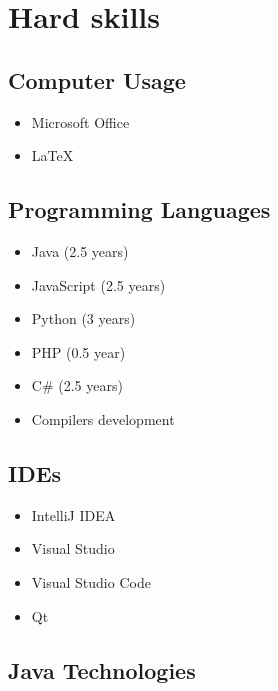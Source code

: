 \documentclass[a4paper,12pt]{article}
\begin{document}
\section*{Hard skills}

\subsection*{Computer Usage}

\begin{itemize}
    \item Microsoft Office
    \item LaTeX 
\end{itemize}

\subsection*{Programming Languages}

\begin{multicols}{2}
\begin{itemize}
    \item Java (2.5 years)
    \item JavaScript (2.5 years)
    \item Python (3 years)
    \item PHP (0.5 year)
    \item C\# (2.5 years)
    \item Compilers development
\end{itemize}
\end{multicols}

\subsection*{IDEs}

\begin{multicols}{2}
\begin{itemize}
    \item IntelliJ IDEA
    \item Visual Studio
    \item Visual Studio Code
    \item Qt
\end{itemize}
\end{multicols}

\subsection*{Java Technologies}
\end{document}
